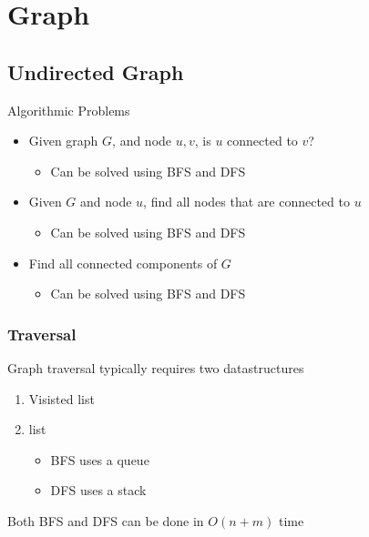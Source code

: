 \chapter{Graph}

\section{Undirected Graph}

  Algorithmic Problems

  \begin{itemize}
    \item Given graph $ G $, and node $ u, v $, is $ u $ connected to $ v $?
    \begin{itemize}
      \item Can be solved using BFS and DFS
    \end{itemize}

    \item Given $ G $ and node $ u $, find all nodes that are connected to $ u $
    \begin{itemize}
      \item Can be solved using BFS and DFS
    \end{itemize}

    \item Find all connected components of $ G $
    \begin{itemize}
      \item Can be solved using BFS and DFS
    \end{itemize}
  \end{itemize}

  \subsection{Traversal}

    Graph traversal typically requires two datastructures

    \begin{enumerate}
      \item Visisted list
      \item {} list
      \begin{itemize}
        \item BFS uses a queue
        \item DFS uses a stack
      \end{itemize}
    \end{enumerate}

    Both BFS and DFS can be done in $ O\left( n + m \right) $ time

